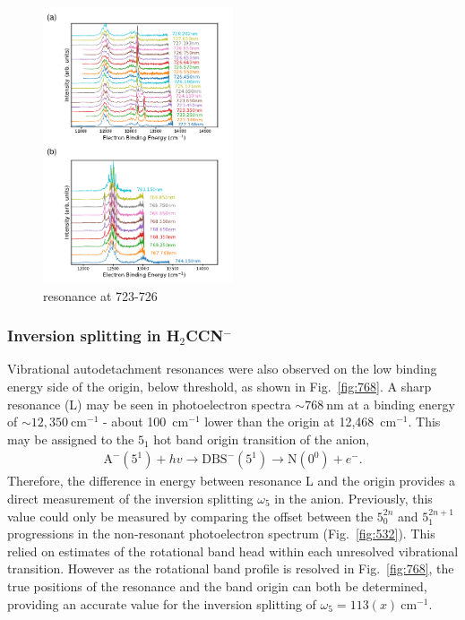 \documentclass[journal=jpcafh,manuscript=article,layout=onecolumn, 12pt]{achemso}
\begin{document}
\begin{figure}
	\includegraphics[width=0.5\textwidth]{figures/Fig4}
	\caption{resonance at 723-726}
	\label{fig:723}
\end{figure}

\subsubsection{Inversion splitting in H$_2$CCN$^-$}
Vibrational autodetachment resonances were also observed on the low binding energy side of the origin, below threshold, as shown in Fig.~\ref{fig:768}. A sharp resonance (L) may be seen in photoelectron spectra $\sim 768~$nm at a binding energy of $\sim 12,350~$cm$^{-1}$ - about 100~cm$^{-1}$ lower than the origin at 12,468~cm$^{-1}$. This may be assigned to the $5_1$ hot band origin transition of the anion, 
\begin{align*}
	\text{A}^-(5^1) +hv \rightarrow \text{DBS}^-(5^1) \rightarrow \text{N}(0^0) + e^-.
\end{align*}
Therefore, the difference in energy between resonance L and the origin provides a direct measurement of the inversion splitting $\omega_5$ in the anion. Previously, this value could only be measured by comparing the offset between the $5^{2n}_0$ and $5^{2n+1}_1$ progressions in the non-resonant photoelectron spectrum (Fig.~\ref{fig:532}). This relied on estimates of the rotational band head within each unresolved vibrational transition. However as the rotational band profile is resolved in Fig.~\ref{fig:768}, the true positions of the resonance and the band origin can both be determined, providing an accurate value for the inversion splitting of $\omega_5 = 113(x)~$cm$^{-1}$.
\end{document}
